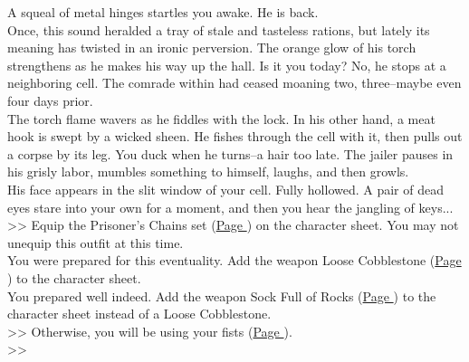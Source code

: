 A squeal of metal hinges startles you awake. He is back.\\

Once, this sound heralded a tray of stale and tasteless rations, but lately its meaning has twisted in an ironic perversion. The orange glow of his torch strengthens as he makes his way up the hall. Is it you today? No, he stops at a neighboring cell. The comrade within had ceased moaning two, three--maybe even four days prior.\\

The torch flame wavers as he fiddles with the lock. In his other hand, a meat hook is swept by a wicked sheen. He fishes through the cell with it, then pulls out a corpse by its leg. You duck when he turns--a hair too late. The jailer pauses in his grisly labor, mumbles something to himself, laughs, and then growls.\\

His face appears in the slit window of your cell. Fully hollowed. A pair of dead eyes stare into your own for a moment, and then you hear the jangling of keys...\\

>> Equip the Prisoner’s Chains set (\hyperlink{Prisoner’s Chains}{Page \pageref{Prisoner’s Chains}}) on the character sheet. You may not unequip this outfit at this time.\\
 You were prepared for this eventuality. Add the weapon Loose Cobblestone (\hyperlink{Loose Cobblestone}{Page \pageref{Loose Cobblestone}}) to the character sheet.\\
 You prepared well indeed. Add the weapon Sock Full of Rocks (\hyperlink{Sock Full of Rocks}{Page \pageref{Sock Full of Rocks}}) to the character sheet instead of a Loose Cobblestone.\\
>> Otherwise, you will be using your fists (\hyperlink{Fist}{Page \pageref{Fist}}).\\

>>